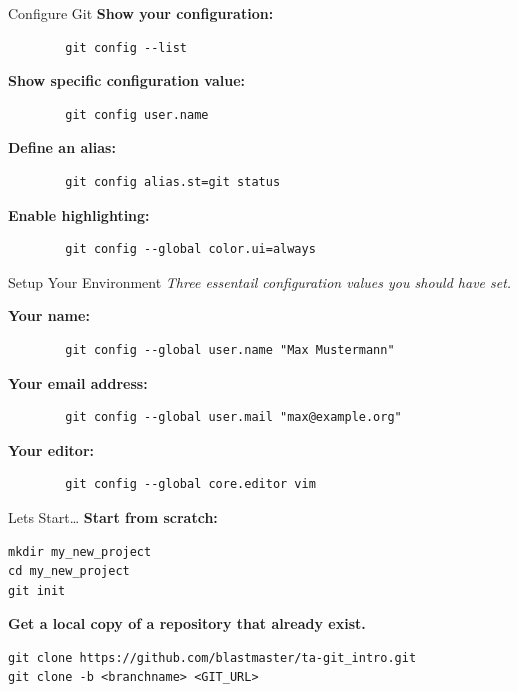 \begin{frame}[fragile]{Configure Git}
    \textbf{Show your configuration:}
    \begin{lstlisting}
        git config --list
    \end{lstlisting}
    \textbf{Show specific configuration value:}
    \begin{lstlisting}
        git config user.name
    \end{lstlisting}
    \textbf{Define an alias:}
    \begin{lstlisting}
        git config alias.st=git status
    \end{lstlisting}
    \textbf{Enable highlighting:}
    \begin{lstlisting}
        git config --global color.ui=always
    \end{lstlisting}
\end{frame}

\begin{frame}[fragile]{Setup Your Environment}
    \emph{Three essentail configuration values you should have set.}
    \vspace{1cm}

    \textbf{Your name:}
    \begin{lstlisting}
        git config --global user.name "Max Mustermann"
    \end{lstlisting}
    \textbf{Your email address:}
    \begin{lstlisting}
        git config --global user.mail "max@example.org"
    \end{lstlisting}
    \textbf{Your editor:}
    \begin{lstlisting}
        git config --global core.editor vim
    \end{lstlisting}
\end{frame}

\begin{frame}[fragile]{Lets Start\ldots}
    \textbf{Start from scratch:}
    \begin{lstlisting}
mkdir my_new_project
cd my_new_project
git init
    \end{lstlisting}
    \textbf{Get a local copy of a repository that already exist.}
    \begin{lstlisting}
git clone https://github.com/blastmaster/ta-git_intro.git
git clone -b <branchname> <GIT_URL>
    \end{lstlisting}
\end{frame}

